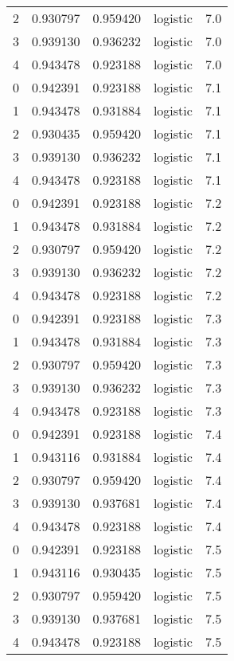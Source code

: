 \begin{tabular}{rrrlr}
     2 & 0.930797 & 0.959420 & logistic &        7.0 \\
     3 & 0.939130 & 0.936232 & logistic &        7.0 \\
     4 & 0.943478 & 0.923188 & logistic &        7.0 \\
     0 & 0.942391 & 0.923188 & logistic &        7.1 \\
     1 & 0.943478 & 0.931884 & logistic &        7.1 \\
     2 & 0.930435 & 0.959420 & logistic &        7.1 \\
     3 & 0.939130 & 0.936232 & logistic &        7.1 \\
     4 & 0.943478 & 0.923188 & logistic &        7.1 \\
     0 & 0.942391 & 0.923188 & logistic &        7.2 \\
     1 & 0.943478 & 0.931884 & logistic &        7.2 \\
     2 & 0.930797 & 0.959420 & logistic &        7.2 \\
     3 & 0.939130 & 0.936232 & logistic &        7.2 \\
     4 & 0.943478 & 0.923188 & logistic &        7.2 \\
     0 & 0.942391 & 0.923188 & logistic &        7.3 \\
     1 & 0.943478 & 0.931884 & logistic &        7.3 \\
     2 & 0.930797 & 0.959420 & logistic &        7.3 \\
     3 & 0.939130 & 0.936232 & logistic &        7.3 \\
     4 & 0.943478 & 0.923188 & logistic &        7.3 \\
     0 & 0.942391 & 0.923188 & logistic &        7.4 \\
     1 & 0.943116 & 0.931884 & logistic &        7.4 \\
     2 & 0.930797 & 0.959420 & logistic &        7.4 \\
     3 & 0.939130 & 0.937681 & logistic &        7.4 \\
     4 & 0.943478 & 0.923188 & logistic &        7.4 \\
     0 & 0.942391 & 0.923188 & logistic &        7.5 \\
     1 & 0.943116 & 0.930435 & logistic &        7.5 \\
     2 & 0.930797 & 0.959420 & logistic &        7.5 \\
     3 & 0.939130 & 0.937681 & logistic &        7.5 \\
     4 & 0.943478 & 0.923188 & logistic &        7.5 \\

\end{tabular}
